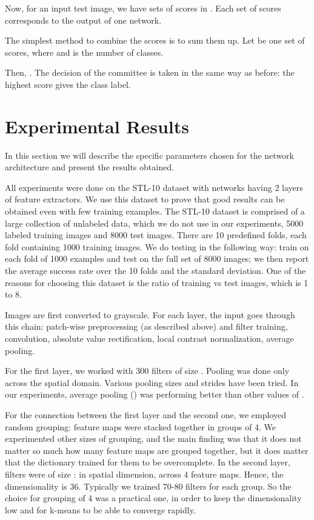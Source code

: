 \documentclass[runningheads]{llncs}
\begin{document}
Now, for an input test image, we have  sets of scores in . Each set of scores corresponds to the output of one network.

The simplest method to combine the scores is to sum them up.
Let  be one set of scores, where  and  is the number of classes.

Then, . The decision of the committee is taken in the same way as before: the highest score gives the class label.

\section{Experimental Results}
In this section we will describe the specific parameters chosen for the network architecture and present the results obtained.

All experiments were done on the STL-10 dataset with networks having 2 layers of feature extractors. We use this dataset to prove that good results can be obtained even with few training examples.
The STL-10 dataset is comprised of a large collection of unlabeled data, which we do not use in our experiments, 5000 labeled training images and 8000 test images. There are 10 predefined folds, each fold containing 1000 training images. We do testing in the following way: train on each fold of 1000 examples and test on the full set of 8000 images; we then report the average success rate over the 10 folds and the standard deviation.
One of the reasons for choosing this dataset is the ratio of training vs test images, which is 1 to 8.

Images are first converted to grayscale. 
For each layer, the input goes through this chain: patch-wise preprocessing (as described above) and filter training, convolution, absolute value rectification, local contrast normalization, average pooling.

For the first layer, we worked with 300 filters of size . 
Pooling was done only across the spatial domain. Various pooling sizes and strides have been tried.
In our experiments, average pooling () was performing better than other values of .

For the connection between the first layer and the second one, we employed random grouping: feature maps were stacked together in groups of 4. We experimented other sizes of grouping, and the main finding was that it does not matter so much how many feature maps are grouped together, but it does matter that the dictionary trained for them to be overcomplete.
In the second layer, filters were of size :  in spatial dimension, across 4 feature maps. Hence, the dimensionality is 36. Typically we trained 70-80 filters for each group. So the choice for grouping of 4 was a practical one, in order to keep the dimensionality low and for k-means to be able to converge rapidly.
\end{document}

